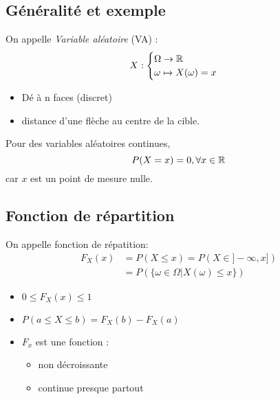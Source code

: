 \documentclass[main.tex]{subfiles}
\begin{document}
\subsection{Généralité et exemple}
\begin{defin}
  On appelle \emph{Variable aléatoire} (VA) :
  \[
    X :
    \begin{cases}
      \Omega \to \mathbb{R} \\
      \omega \mapsto X(\omega)=x
    \end{cases}
  \]
\end{defin}
\begin{exemple}
  \begin{itemize}
  \item Dé à n faces (discret)
  \item distance d'une flèche au centre de la cible.
  \end{itemize}
\end{exemple}
\begin{prop}
  Pour des variables aléatoires continues,
  \[
    P(X=x) = 0 , \forall x\in \mathbb{R}
  \]
  car $x$ est un point de mesure nulle.
\end{prop}


\subsection{Fonction de répartition}

\begin{defin}
  On appelle fonction de répatition:
  \begin{align*}
    F_X(x) &= P(X\leq x) = P(X \in ]-\infty,x])\\
           &=P(\{\omega \in \Omega|X(\omega)\le x \})
  \end{align*}
\end{defin}
\begin{prop}
  \begin{itemize}
  \item $0 \le F_X(x) \le1$
  \item $P(a\le X\le b) = F_X(b)-F_X(a)$
  \item $F_x$ est une fonction :
    \begin{itemize}
    \item non décroissante
    \item continue presque partout
    \end{itemize}
  \end{itemize}
\end{prop}
\end{document}
